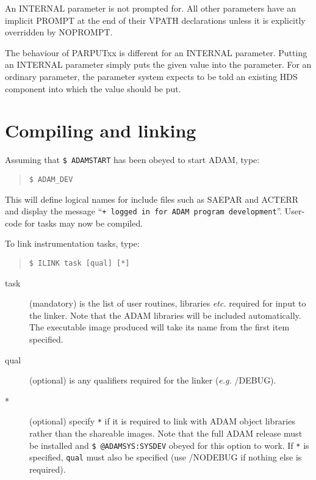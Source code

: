 \documentclass[twoside,11pt]{article}
\newcommand{\xlabel}[1]{}
\renewcommand{\_}{\texttt{\symbol{95}}}
\begin{document}
An INTERNAL parameter is not prompted for. All other parameters have an
implicit PROMPT at the end of their VPATH declarations unless it is
explicitly overridden by NOPROMPT.

The behaviour of PAR\_PUTxx is different for an INTERNAL parameter.
Putting an INTERNAL parameter simply puts the given value into the
parameter. For an ordinary parameter, the parameter system expects to be
told an existing HDS component into which the value should be put.

\section{Compiling and linking\xlabel{compiling_and_linking}}

Assuming that \texttt{\$ ADAMSTART} has been obeyed to start ADAM, type:
\small \begin{quote} \begin{verbatim}
$ ADAM_DEV
\end{verbatim} \end{quote} \normalsize
This will define logical names for include files such as SAE\_PAR and ACT\_ERR
and display the message
``\texttt{+ logged in for ADAM program development}''.
User-code for tasks may now be compiled.

To link instrumentation tasks, type:
\small \begin{quote} \begin{verbatim}
$ ILINK task [qual] [*]
\end{verbatim} \end{quote} \normalsize
\begin{description}
\item[task] (mandatory) is the list of user routines, libraries {\em etc.}
required for input to the linker. Note that the ADAM libraries will be
included automatically. The executable image produced will take its name from
the first item specified.
\item[qual] (optional) is any qualifiers required for the linker ({\em e.g.}
/DEBUG).
\item[*] (optional) specify \texttt{*} if it is required to link with ADAM object
libraries rather than the shareable images. Note that the full ADAM release
must be installed and \texttt{\$ @ADAM\_SYS:SYSDEV} obeyed for this option to
work. If \texttt{*} is specified, \texttt{qual} must also be specified (use
/NODEBUG if nothing else is required).
\end{description}
\end{document}
